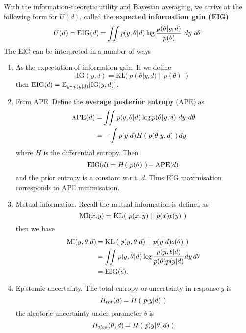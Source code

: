 With the information-theoretic utility and Bayesian averaging, we arrive at the following form for $U(d)$, called the \textbf{expected information gain (EIG)}
\begin{equation}
	U(d) = \text{EIG}(d) = \iint p(y, \theta | d) \log\frac{p(\theta | y, d)}{p(\theta)} \ dy\ d\theta
\end{equation}
The EIG can be interpreted in a number of ways
\begin{enumerate}
\item As the expectation of information gain. If we define
\begin{equation}
	\text{IG}(y, d) = \text{KL}(\ p(\theta | y, d)\ ||\ p(\theta)\ ) 
\end{equation}
then $\text{EIG}(d) = \mathbb{E}_{y\sim p(y|d)}[\text{IG}(y, d)] $.
\item From APE. Define the \textbf{average posterior entropy} (APE) as 
\begin{align}
	\ape(d) &= \iint p(y, \theta | d) \log p(\theta | y, d) \ dy \ d\theta \\
	&= -\int p(y|d) \entropy{p(\theta | y, d)} dy
\end{align}
where $H$ is the differential entropy.
Then
\begin{equation}
	\label{eq:apeeig}
	\text{EIG}(d) = H\left(\ p(\theta)\ \right) - \text{APE}(d)
\end{equation}
and the prior entropy is a constant w.r.t. $d$. Thus EIG maximisation corresponds to APE
minimisation.
\item Mutual information. Recall the mutual information is defined as
\begin{equation}
	\text{MI}(x, y) = \text{KL}\left(\ p(x, y)\ ||\ p(x)p(y)\ \right)
\end{equation}
then we have
\begin{align}
	\text{MI}(y, \theta | d) &= \text{KL}\left(\ p(y, \theta | d)\ ||\ p(y|d)p(\theta)\ \right) \\
	&= \iint p(y, \theta | d) \log \frac{p(y, \theta | d)}{p(\theta)p(y|d)} dy \, d\theta \\
	&= \text{EIG}(d).
\end{align}
\item Epistemic uncertainty.
The total entropy or uncertainty in response $y$ is
\begin{equation}
	H_{tot}(d) = H\left(\ p(y|d)\ \right)
\end{equation}
the aleatoric uncertainty under parameter $\theta$ is
\begin{equation}
	H_{alea}(\theta, d) = H\left(\ p(y|\theta, d)\ \right)
\end{equation}

\end{enumerate}
